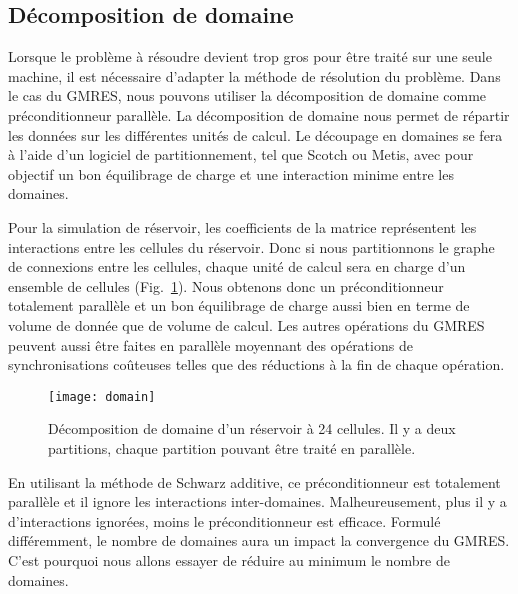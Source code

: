 \subsection{Décomposition de domaine}
Lorsque le problème à résoudre devient trop gros pour être traité sur une seule machine, il est nécessaire d'adapter la méthode de résolution du problème.
%
Dans le cas du GMRES, nous pouvons utiliser la décomposition de domaine comme préconditionneur parallèle.
%
La décomposition de domaine nous permet de répartir les données sur les différentes unités de calcul.
%
Le découpage en domaines se fera à l'aide d'un logiciel de partitionnement, tel que Scotch ou Metis, avec pour objectif un bon équilibrage de charge et une interaction minime entre les domaines.


Pour la simulation de réservoir, les coefficients de la matrice représentent les interactions entre les cellules du réservoir.
%
Donc si nous partitionnons le graphe de connexions entre les cellules, chaque unité de calcul sera en charge d'un ensemble de cellules (Fig.~\ref{fig:domain}).
%
Nous obtenons donc un préconditionneur totalement parallèle et un bon équilibrage de charge aussi bien en terme de volume de donnée que de volume de calcul.
%
Les autres opérations du GMRES peuvent aussi être faites en parallèle moyennant des opérations de synchronisations coûteuses telles que des réductions à la fin de chaque opération.

\begin{figure}[t!]
  \centering
  \texttt{[image: domain]}
  \caption{Décomposition de domaine d'un réservoir à 24 cellules. Il y a deux partitions, chaque partition pouvant être traité en parallèle.}
  \label{fig:domain}
\end{figure}

En utilisant la méthode de Schwarz additive, ce préconditionneur est totalement parallèle et il ignore les interactions inter-domaines.
%
Malheureusement, plus il y a d'interactions ignorées, moins le préconditionneur est efficace.
%
Formulé différemment, le nombre de domaines aura un impact la convergence du GMRES.
%
C'est pourquoi nous allons essayer de réduire au minimum le nombre de domaines.
